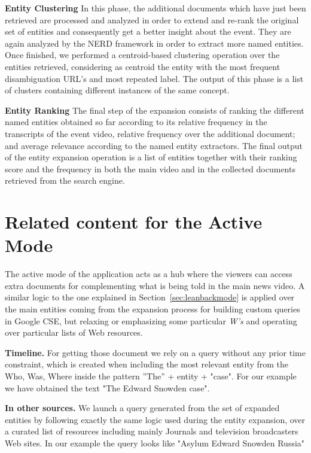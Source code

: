 \documentclass{llncs}
\begin{document}
\textbf{Entity Clustering}
In this phase, the additional documents which have just been retrieved are processed and analyzed in order to extend and re-rank the original set of entities and consequently get a better insight about the event. They are again analyzed by the NERD framework in order to extract more named entities. Once finished, we performed a centroid-based clustering operation over the entities retrieved, considering as centroid the entity with the most frequent disambiguation URL's and most repeated label. The output of this phase is a list of clusters containing different instances of the same concept.

\textbf{Entity Ranking}
The final step of the expansion consists of ranking the different named entities obtained so far according to its relative frequency in the transcripts of the event video, relative frequency over the additional document; and average relevance according to the named entity extractors. The final output of the entity expansion operation is a list of entities together with their ranking score and the frequency in both the main video and in the collected documents retrieved from the search engine.

\section{Related content for the Active Mode}
\label{sec:leanforwardmode}
The active mode of the application acts as a hub where the viewers can access extra documents for complementing what is being told in the main news video. A similar logic to the one explained in Section~\ref{sec:leanbackmode} is applied over the main entities coming from the expansion process for building custom queries in Google CSE, but relaxing or emphasizing some particular \emph{W's} and operating over particular lists of Web resources.

\textbf{Timeline.} For getting those document we rely on a query without any prior time constraint, which is created when including the most relevant entity from the Who, Was, Where inside the pattern ''The'' + entity + "case". For our example we have obtained the text "The Edward Snowden case".

\textbf{In other sources.} We launch a query generated from the set of expanded entities by following exactly the same logic used during the entity expansion, over a curated list of resources including mainly Journals and television broadcasters Web sites. In our example the query looks like "Asylum Edward Snowden Russia"
\end{document}
